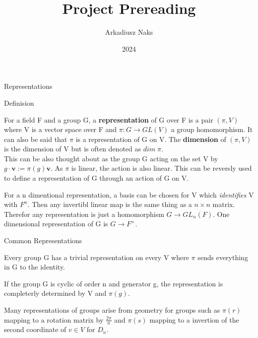 \documentclass[12pt, letterpaper]{article}
\title{Project Prereading}
\author{Arkadiusz Naks}
\date{2024}
\begin{document}
\tableofcontents
\newpage

\begin{section}{Representations}

  \begin{subsection}{Definision}

    For a field F and a group G, a \textbf{representation} of G over F is a pair
    \((\pi, V)\) where V is a vector space over F and \(\pi: G \to GL(V)\) a
    group homomorphism. It can also be said that \(\pi\) is a representation of
    G on V. The \textbf{dimension} of \((\pi, V)\) is the dimension of V but is
    often denoted as \(dim \; \pi\). \\
    This can be also thought about as the group G acting on the set V by
    \(g \cdot \textbf{v} := \pi(g) \textbf{v}\). As \(\pi\) is linear, the
    action is also linear. This can be reversly used to define a representation
    of G through an action of G on V.

    For a n dimentional representation, a basis can be chosen for V which
    \textit{identifies} V with \(F^{n}\). Then any invertibl linear map is the
    same thing as a \(n \times n\) matrix. Therefor any representation is
    just a homomorphism \(G \to GL_{n}(F)\). One dimensional representation of G
    is \(G \to F^{\times}\).

  \end{subsection}

  \begin{subsection}{Common Representations}

      Every group G has a trivial representation on every V where \(\pi\) sends
      everything in G to the identity.

      If the group G is cyclic of order n and generator g, the representation is
      completerly determined by V and \(\pi(g)\).

      Many representations of groups arise from geometry for groups such as
      \(\pi(r)\) mapping to a rotation matrix by \(\frac{2 \pi}{n}\) and
      \(\pi(s)\) mapping to a invertion of the second coordinate of \(v \in V\)
      for \(D_{n}\).


\end{subsection}
\end{section}
\end{document}
